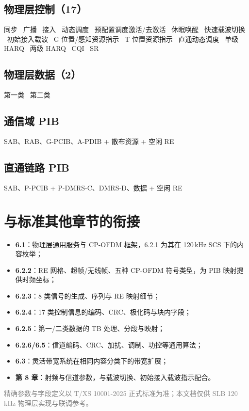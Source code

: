 \documentclass[11pt,a4paper]{ctexart}
\begin{document}
\subsection{物理层控制（17）}
同步 \textbar\ 广播 \textbar\ 接入 \textbar\ 动态调度 \textbar\ 预配置调度激活/去激活 \textbar\ 休眠唤醒 \textbar\ 快速载波切换 \textbar\ 初始接入载波 \textbar\ G 位置/感知资源指示 \textbar\ T 位置资源指示 \textbar\ 直通动态调度 \textbar\ 单级 HARQ \textbar\ 两级 HARQ \textbar\ CQI \textbar\ SR

\subsection{物理层数据（2）}
第一类 \textbar\ 第二类

\subsection{通信域 PIB}
SAB、RAB、G-PCIB、A-PDIB + 散布资源 + 空闲 RE

\subsection{直通链路 PIB}
SAB、P-PCIB + P-DMRS-C、DMRS-D、数据 + 空闲 RE

\section{与标准其他章节的衔接}

\begin{itemize}[nosep]
  \item \textbf{6.1}：物理层通用服务与 CP-OFDM 框架，6.2.1 为其在 120\,kHz SCS 下的内容枚举；
  \item \textbf{6.2.2}：RE 网格、超帧/无线帧、五种 CP-OFDM 符号类型，为 PIB 映射提供时频坐标；
  \item \textbf{6.2.3}：8 类信号的生成、序列与 RE 映射细节；
  \item \textbf{6.2.4}：17 类控制信息的编码、CRC、极化码与块内字段；
  \item \textbf{6.2.5}：第一/二类数据的 TB 处理、分段与映射；
  \item \textbf{6.2.6/6.5}：信道编码、CRC、加扰、调制、功控等通用算法；
  \item \textbf{6.3}：灵活带宽系统在相同内容分类下的带宽扩展；
  \item \textbf{第 8 章}：射频与信道参数，与载波切换、初始接入载波指示配合。
\end{itemize}

\vfill
\begin{center}
\small\textcolor{gray}{精确参数与字段定义以 T/XS 10001-2025 正式标准为准；本文档仅供 SLB 120\,kHz 物理层实现与联调参考。}
\end{center}
\end{document}
